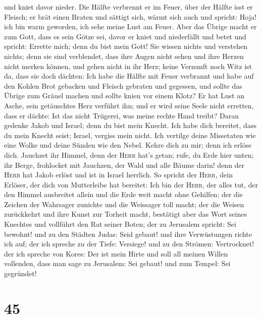 und kniet davor nieder.  Die Hälfte verbrennt er im
Feuer, über der Hälfte isst er Fleisch; er brät einen Braten und sättigt
sich, wärmt sich auch und spricht: Hoja! ich bin warm geworden, ich sehe
meine Lust am Feuer.  Aber das Übrige macht er zum Gott,
dass es sein Götze sei, davor er kniet und niederfällt und betet und
spricht: Errette mich; denn du bist mein Gott!  Sie
wissen nichts und verstehen nichts; denn sie sind verblendet, dass ihre
Augen nicht sehen und ihre Herzen nicht merken können, 
und gehen nicht in ihr Herz; keine Vernunft noch Witz ist da, dass sie
doch dächten: Ich habe die Hälfte mit Feuer verbrannt und habe auf den
Kohlen Brot gebacken und Fleisch gebraten und gegessen, und sollte das
Übrige zum Gräuel machen und sollte knien vor einem Klotz?
 Er hat Lust an Asche, sein getäuschtes Herz verführt
ihn; und er wird seine Seele nicht erretten, dass er dächte: Ist das
nicht Trügerei, was meine rechte Hand treibt?  Daran
gedenke Jakob und Israel; denn du bist mein Knecht. Ich habe dich
bereitet, dass du mein Knecht seist; Israel, vergiss mein nicht.
 Ich vertilge deine Missetaten wie eine Wolke und deine
Sünden wie den Nebel. Kehre dich zu mir; denn ich erlöse dich.
 Jauchzet ihr Himmel, denn der \textsc{Herr} hat's getan;
rufe, du Erde hier unten; ihr Berge, frohlocket mit Jauchzen, der Wald
und alle Bäume darin! denn der \textsc{Herr} hat Jakob erlöst und ist in
Israel herrlich.  So spricht der \textsc{Herr}, dein
Erlöser, der dich von Mutterleibe hat bereitet: Ich bin der
\textsc{Herr}, der alles tut, der den Himmel ausbreitet allein und die
Erde weit macht ohne Gehilfen;  der die Zeichen der
Wahrsager zunichte und die Weissager toll macht; der die Weisen
zurückkehrt und ihre Kunst zur Torheit macht,  bestätigt
aber das Wort seines Knechtes und vollführt den Rat seiner Boten; der zu
Jerusalem spricht: Sei bewohnt! und zu den Städten Judas: Seid gebaut!
und ihre Verwüstungen richte ich auf;  der ich spreche zu
der Tiefe: Versiege! und zu den Strömen: Vertrocknet! 
der ich spreche von Kores: Der ist mein Hirte und soll all meinen Willen
vollenden, dass man sage zu Jerusalem: Sei gebaut! und zum Tempel: Sei
gegründet!

\hypertarget{section-44}{%
\section{45}\label{section-44}}

